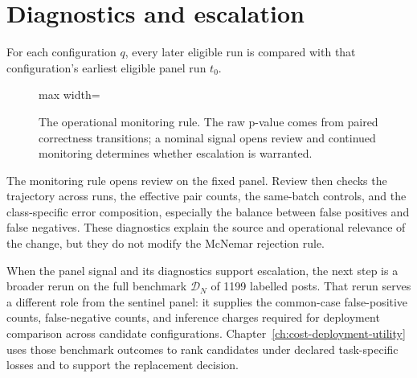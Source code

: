 \section{Diagnostics and escalation}
\label{sec:classification-metrics}

For each configuration \(q\), every later eligible run is compared with that configuration's earliest eligible panel run \(t_0\).

\begin{figure}[htbp]
\centering
\begin{adjustbox}{max width=\linewidth}

\end{adjustbox}
\caption[Paired monitoring signal rule]{The operational monitoring rule. The raw p-value comes from paired correctness transitions; a nominal signal opens review and continued monitoring determines whether escalation is warranted.}
\label{fig:paired-alert-rule}
\end{figure}

The monitoring rule opens review on the fixed panel. Review then checks the trajectory across runs, the effective pair counts, the same-batch controls, and the class-specific error composition, especially the balance between false positives and false negatives. These diagnostics explain the source and operational relevance of the change, but they do not modify the McNemar rejection rule.

When the panel signal and its diagnostics support escalation, the next step is a broader rerun on the full benchmark \(\mathcal{D}_N\) of 1199 labelled posts. That rerun serves a different role from the sentinel panel: it supplies the common-case false-positive counts, false-negative counts, and inference charges required for deployment comparison across candidate configurations. Chapter~\ref{ch:cost-deployment-utility} uses those benchmark outcomes to rank candidates under declared task-specific losses and to support the replacement decision.